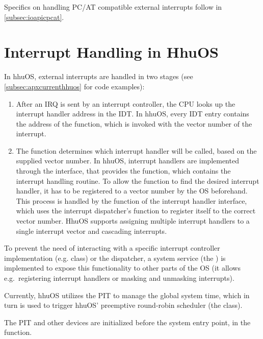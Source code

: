 Specifics on handling PC/AT compatible external interrupts follow in \autoref{subsec:ioapicpcat}.

\section{Interrupt Handling in HhuOS}
\label{sec:currenthhuos}

In hhuOS, external interrupts are handled in two stages (see \autoref{subsec:apxcurrenthhuos} for code examples):

\begin{enumerate}
  \item After an IRQ is sent by an interrupt controller, the CPU looks up the interrupt handler address in the IDT\@.
        In hhuOS, every IDT entry contains the address of the  function, which is invoked with the vector number of the interrupt.
  \item The  function determines which interrupt handler will be called, based on the supplied vector number.
        In hhuOS, interrupt handlers are implemented through the  interface, that provides the  function, which contains the interrupt handling routine.
        To allow the  function to find the desired interrupt handler, it has to be registered to a vector number by the OS beforehand.
        This process is handled by the  function of the interrupt handler interface, which uses the interrupt dispatcher's  function to register itself to the correct vector number.
        HhuOS supports assigning multiple interrupt handlers to a single interrupt vector and cascading interrupts.
\end{enumerate}

To prevent the need of interacting with a specific interrupt controller implementation (e.g.  class) or the dispatcher, a system service (the ) is implemented to expose this functionality to other parts of the OS (it allows e.g.\ registering interrupt handlers or masking and unmasking interrupts).

Currently, hhuOS utilizes the PIT to manage the global system time, which in turn is used to trigger hhuOS' preemptive round-robin scheduler (the  class).

The PIT and other devices are initialized before the system entry point, in the  function.

\cleardoublepage